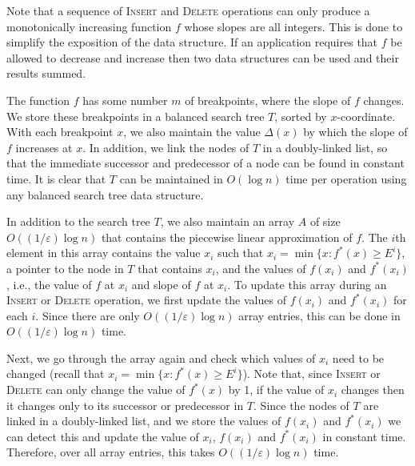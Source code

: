 \documentclass[charterfonts,lotsofwhite]{patmorin}
\newcommand{\eps}{\varepsilon}
\begin{document}
Note that a sequence of \textsc{Insert} and \textsc{Delete} operations
can only produce a monotonically increasing function $f$ whose slopes
are all integers.  This is done to simplify the exposition of the data
structure.  If an application requires that $f$ be allowed to decrease
and increase then two data structures can be used and their results
summed.  

The function $f$ has some number $m$ of breakpoints, where the slope
of $f$ changes.  We store these breakpoints in a balanced search tree
$T$, sorted by $x$-coordinate.  With each breakpoint $x$, we also
maintain the value $\Delta(x)$ by which the slope of $f$ increases at
$x$.  In addition, we link the nodes of $T$ in a doubly-linked list,
so that the immediate successor and predecessor of a node can be found
in constant time.  It is clear that $T$ can be maintained in $O(\log
n)$ time per operation using any balanced search tree data structure.

In addition to the search tree $T$, we also maintain an array $A$ of
size $O((1/\eps) \log n)$ that contains the piecewise linear
approximation of $f$.  The $i$th element in this array contains the
value $x_i$ such that $x_i=\min\{x:f^*(x) \ge E^i \}$, a pointer to
the node in $T$ that contains $x_i$, and the values of $f(x_i)$ and
$f^*(x_i)$, i.e., the value of $f$ at $x_i$ and slope of $f$ at $x_i$.
To update this array during an \textsc{Insert} or \textsc{Delete}
operation, we first update the values of $f(x_i)$ and $f^*(x_i)$ for
each $i$.  Since there are only $O((1/\eps) \log n)$ array entries,
this can be done in $O((1/\eps) \log n)$ time.

Next, we go through the array again and check which values of $x_i$
need to be changed (recall that $x_i=\min\{x:f^*(x) \ge E^i \}$).
Note that, since \textsc{Insert} or \textsc{Delete} can only change
the value of $f^*(x)$ by 1, if the value of $x_i$ changes then it
changes only to its successor or predecessor in $T$.  Since the nodes
of $T$ are linked in a doubly-linked list, and we store the values of
$f(x_i)$ and $f^*(x_i)$ we can detect this and update the value of
$x_i$, $f(x_i)$ and $f^*(x_i)$ in constant time.  Therefore, over all
array entries, this takes $O((1/\eps) \log n)$ time.
\end{document}
